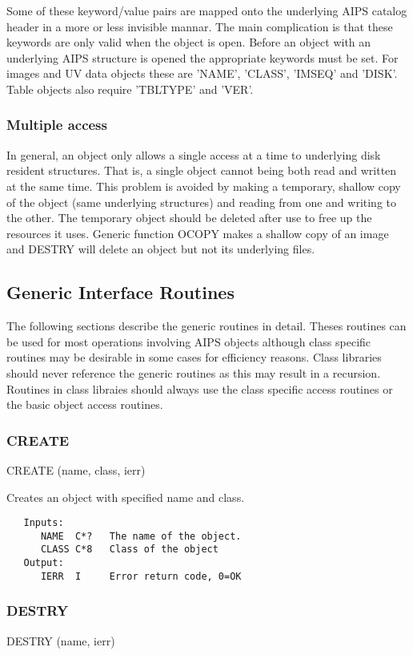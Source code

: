    Some of these keyword/value pairs are mapped onto the
underlying AIPS catalog header in a more or less invisible mannar.
The main complication is that these keywords are only valid when the
object is open.  Before an object with an underlying AIPS structure is
opened the appropriate keywords must be set.  For images and UV data
objects these are 'NAME', 'CLASS', 'IMSEQ' and 'DISK'.  Table objects
also require 'TBLTYPE' and 'VER'.

\subsubsection {Multiple access}

   In general, an object only allows a single access at a time to
underlying disk resident structures.  That is, a single object cannot
being both read and written at the same time.  This problem is avoided
by making a temporary, shallow copy of the object (same underlying
structures) and reading from one and writing to the other.  The
temporary object should be deleted after use to free up the resources
it uses.  Generic function OCOPY makes a shallow copy of an image and
DESTRY will delete an object but not its underlying files.

\subsection{Generic Interface Routines}
   The following sections describe the generic routines in detail.
Theses routines can be used for most operations involving AIPS objects
although class specific routines may be desirable in some cases for
efficiency reasons.
    Class libraries should never reference the generic routines as
this may result in a recursion.  Routines in class libraies should
always use the class specific access routines or the basic object
access routines.
\subsubsection{CREATE}
    CREATE (name, class, ierr)

   Creates an object with specified name and class.
{\small\begin{verbatim}
   Inputs:
      NAME  C*?   The name of the object.
      CLASS C*8   Class of the object
   Output:
      IERR  I     Error return code, 0=OK
\end{verbatim}}
\subsubsection{DESTRY}
   DESTRY (name, ierr)

